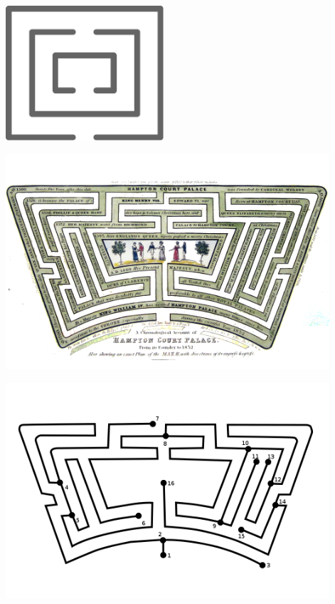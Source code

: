 \documentclass{beamer} %
\begin{document}
\begin{frame}
  \centering
  \includegraphics[height=50mm]{assets/maze.pdf}
\end{frame}

\begin{frame}
  \centering
  \includegraphics[height=80mm]{assets/hampton1.png}
\end{frame}

\begin{frame}
  \centering
  \includegraphics[height=80mm]{assets/hampton2.png}
\end{frame}
\end{document}

